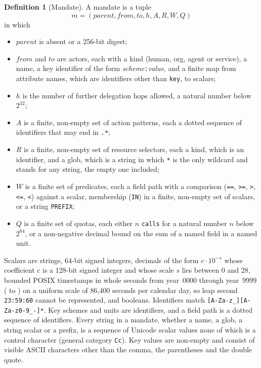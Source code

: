 \documentclass[10pt,twocolumn]{article}
\theoremstyle{plain}
\theoremstyle{definition}
\newtheorem{definition}{Definition}
\begin{document}
\begin{definition}[Mandate]
\label{def:mandate}
A mandate is a tuple
\[
  m = (\mathit{parent}, \mathit{from}, \mathit{to}, h, A, R, W, Q)
\]
in which
\begin{itemize}[leftmargin=*,itemsep=0pt,topsep=2pt]
  \item $\mathit{parent}$ is absent or a 256-bit digest;
  \item $\mathit{from}$ and $\mathit{to}$ are actors, each with a kind (human, org, agent or service), a name, a key identifier of the form \emph{scheme}\texttt{:}\emph{value}, and a finite map from attribute names, which are identifiers other than \texttt{key}, to scalars;
  \item $h$ is the number of further delegation hops allowed, a natural number below $2^{32}$;
  \item $A$ is a finite, non-empty set of action patterns, each a dotted sequence of identifiers that may end in \texttt{.*};
  \item $R$ is a finite, non-empty set of resource selectors, each a kind, which is an identifier, and a glob, which is a string in which \texttt{*} is the only wildcard and stands for any string, the empty one included;
  \item $W$ is a finite set of predicates, each a field path with a comparison (\texttt{==}, \texttt{>=}, \texttt{>}, \texttt{<=}, \texttt{<}) against a scalar, membership (\texttt{IN}) in a finite, non-empty set of scalars, or a string \texttt{PREFIX};
  \item $Q$ is a finite set of quotas, each either $n$ \texttt{calls} for a natural number $n$ below $2^{64}$, or a non-negative decimal bound on the sum of a named field in a named unit.
\end{itemize}
Scalars are strings, 64-bit signed integers, decimals of the form $c \cdot 10^{-s}$ whose coefficient $c$ is a 128-bit signed integer and whose scale $s$ lies between 0 and 28, bounded POSIX timestamps in whole seconds from year~0000 through year~9999 ( to ) on a uniform scale of 86{,}400 seconds per calendar day, so leap second \texttt{23:59:60} cannot be represented, and booleans. Identifiers match \texttt{[A-Za-z\_][A-Za-z0-9\_-]*}. Key schemes and units are identifiers, and a field path is a dotted sequence of identifiers. Every string in a mandate, whether a name, a glob, a string scalar or a prefix, is a sequence of Unicode scalar values none of which is a control character (general category \texttt{Cc}). Key values are non-empty and consist of visible ASCII characters other than the comma, the parentheses and the double quote.
\end{definition}
\end{document}
